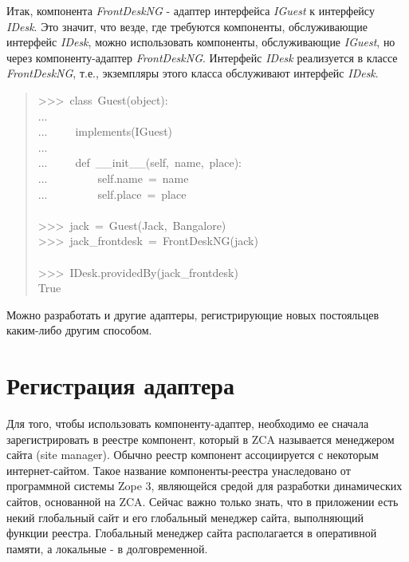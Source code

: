 \documentclass[a4paper,openany,twoside,final]{book}
\providecommand*{\DUroletitlereference}[1]{\textsl{#1}}
\begin{document}
Итак, компонента \DUroletitlereference{FrontDeskNG} - адаптер интерфейса \DUroletitlereference{IGuest} к
интерфейсу \DUroletitlereference{IDesk}.  Это значит, что везде, где требуются компоненты,
обслуживающие интерфейс \DUroletitlereference{IDesk}, можно использовать компоненты,
обслуживающие \DUroletitlereference{IGuest}, но через компоненту-адаптер \DUroletitlereference{FrontDeskNG}.
Интерфейс \DUroletitlereference{IDesk} реализуется в классе \DUroletitlereference{FrontDeskNG}, т.е., экземпляры
этого класса обслуживают интерфейс \DUroletitlereference{IDesk}.

\begin{quote}{\ttfamily \raggedright \noindent
>{}>{}>~class~Guest(object):\\
...\\
...~~~~~implements(IGuest)\\
...\\
...~~~~~def~\_\_init\_\_(self,~name,~place):\\
...~~~~~~~~~self.name~=~name\\
...~~~~~~~~~self.place~=~place\\
~\\
>{}>{}>~jack~=~Guest(\textquotedbl{}Jack\textquotedbl{},~\textquotedbl{}Bangalore\textquotedbl{})\\
>{}>{}>~jack\_frontdesk~=~FrontDeskNG(jack)\\
~\\
>{}>{}>~IDesk.providedBy(jack\_frontdesk)\\
True
}
\end{quote}

Можно разработать и другие адаптеры, регистрирующие новых
постояльцев каким-либо другим способом.


\section{Регистрация адаптера%
  \label{id35}%
}

Для того, чтобы использовать компоненту-адаптер, необходимо ее сначала
зарегистрировать в реестре компонент, который в ZCA называется
менеджером сайта (site manager).  Обычно реестр компонент
ассоциируется с некоторым интернет-сайтом.  Такое название
компоненты-реестра унаследовано от программной системы Zope 3,
являющейся средой для разработки динамических сайтов, основанной на
ZCA.  Сейчас важно только знать, что в приложении есть некий
глобальный сайт и его глобальный менеджер сайта, выполняющий функции
реестра.  Глобальный менеджер сайта располагается в оперативной
памяти, а локальные - в долговременной.
\end{document}
